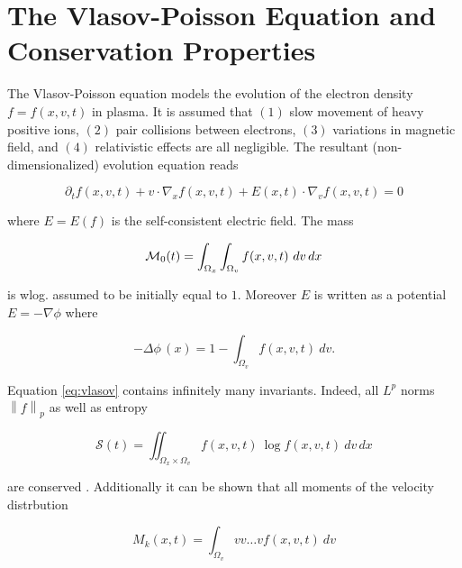 
\section{The Vlasov-Poisson Equation and Conservation Properties}\label{sec:vlasov}

The Vlasov-Poisson equation models the evolution of the electron density $f = f(x, v, t)$ 
in plasma. It is assumed that $(1)$ slow movement of heavy positive ions, $(2)$ pair 
collisions between electrons, $(3)$ variations in magnetic field, and $(4)$ relativistic 
effects are all negligible. The resultant (non-dimensionalized) evolution equation reads

\begin{equation}\label{eq:vlasov}
    \partial_t f (x, v, t) 
    + v \cdot \nabla_x f (x, v, t) 
    + E (x, t) \cdot \nabla_v f (x, v, t) = 0
\end{equation}

where $E = E(f)$ is the self-consistent electric field. The mass 

\begin{equation}
    \mathcal{M}_0 (t) = \int_{\Omega_x} \int_{\Omega_v} f(x, v, t)\ dv\, dx
\end{equation}

is wlog. assumed to be initially equal to $1$. Moreover $E$ is written as a potential 
$E = - \nabla \phi$ where 

\begin{equation}
    - \Delta \phi\,(x) = 1 - \int_{\Omega_v} f(x, v, t)\ dv . 
\end{equation}

Equation \ref{eq:vlasov} contains infinitely many invariants. Indeed, all $L^p$ norms 
$\left\| f \right\|_p$ as well as entropy 

\begin{equation}
    \mathcal{S} (t) = \iint_{\Omega_x \times \Omega_v} f(x, v, t)\ \log f(x, v, t)\ dv\,dx
\end{equation}

are conserved \cite{}. Additionally it can be shown \cite{}
 that all moments of the velocity distrbution

\begin{equation}
    M_k (x, t) = \int_{\Omega_v} v v \ldots v f(x, v, t)\ dv 
\end{equation}

